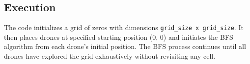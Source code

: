 \documentclass{article}
\begin{document}
\subsection*{Execution}

The code initializes a grid of zeros with dimensions \texttt{grid\_size x grid\_size}. It then places drones at specified starting position (0, 0) and initiates the BFS algorithm from each drone's initial position. The BFS process continues until all drones have explored the grid exhaustively without revisiting any cell.
\end{document}
